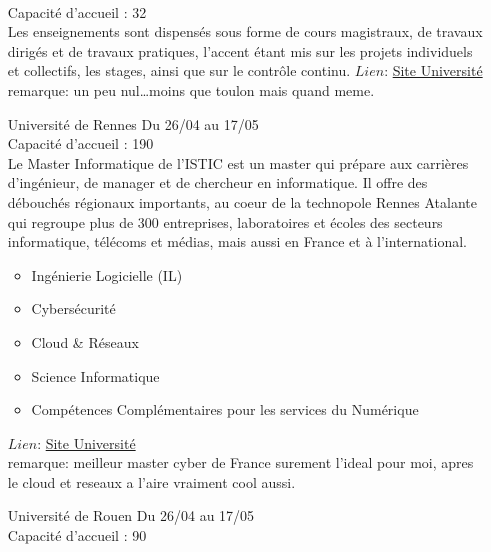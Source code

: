 \documentclass[a4paper,11pt]{article}
\begin{document}
\begin{enumerate}
                    \\Capacité d'accueil : 32
                    \\Les enseignements sont dispensés sous forme de cours magistraux, de travaux dirigés et de travaux pratiques, l’accent étant mis sur les projets individuels et collectifs, les stages, ainsi que sur le contrôle continu.
                    $Lien$: \href{https://www.univ-reims.fr/formation/catalogue-de-formation/master-informatique,23515,38949.html?args=R9qFsCnMmKDtxCa17YTDkHVqaqbfYRXwwTnCVt2witCDUIiVoUdkeMDp%2AXGEGm2SMIhvMbuZ3_kOrRxvJlk6dOorIryuNioRCyFFyPAvhl9tCdwYdtHRrwAvNC1tDg_H&formation_id=198}{Site Université}
                    \\remarque: un peu nul\dots moins que toulon mais quand meme.
\\
        \item [\color{LightOrangeHaf}Université de Rennes] Du 26/04 au 17/05
                    \\Capacité d'accueil : 190
                    \\Le Master Informatique de l'ISTIC est un master qui prépare aux carrières d'ingénieur, de manager et de chercheur en informatique.
Il offre des débouchés régionaux importants, au coeur de la technopole Rennes Atalante qui regroupe plus de 300 entreprises, laboratoires et écoles des secteurs informatique, télécoms et médias, mais aussi en France et à l'international. 
                    \begin{itemize}
                        \item Ingénierie Logicielle (IL)
                        \item Cybersécurité
                        \item Cloud \& Réseaux
                        \item Science Informatique
                        \item Compétences Complémentaires pour les services du Numérique
                    \end{itemize}
                    $Lien$: \href{https://istic.univ-rennes1.fr/master-informatique-premiere-annee}{Site Université}
                    \\remarque: meilleur master cyber de France surement l'ideal pour moi, apres le cloud et reseaux a l'aire vraiment cool aussi.
\\
        \item [\color{LightOrangeHaf}Université de Rouen] Du 26/04 au 17/05
                    \\Capacité d'accueil : 90

\end{enumerate}
\end{document}
